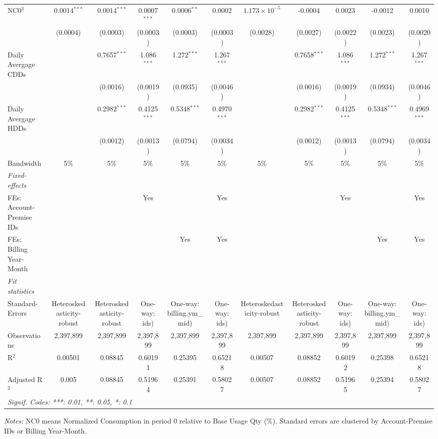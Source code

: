 \begin{table}[htbp]
\begin{tabular}{lcccccccccc}
NC0$^3$&0.0014$^{***}$ & 0.0014$^{***}$ & 0.0007$^{***}$ & 0.0006$^{**}$ & 0.0002 & $1.173\times 10^{-5}$ & -0.0004 & 0.0023 & -0.0012 & 0.0010\\
  &(0.0004) & (0.0003) & (0.0003) & (0.0003) & (0.0003) & (0.0028) & (0.0027) & (0.0022) & (0.0023) & (0.0020)\\
Daily Avergage CDDs&   & 0.7657$^{***}$ & 1.086$^{***}$ & 1.272$^{***}$ & 1.267$^{***}$ &    & 0.7658$^{***}$ & 1.086$^{***}$ & 1.272$^{***}$ & 1.267$^{***}$\\
  &   & (0.0016) & (0.0019) & (0.0935) & (0.0046) &    & (0.0016) & (0.0019) & (0.0934) & (0.0046)\\
Daily Avergage HDDs&   & 0.2982$^{***}$ & 0.4125$^{***}$ & 0.5348$^{***}$ & 0.4970$^{***}$ &    & 0.2982$^{***}$ & 0.4125$^{***}$ & 0.5348$^{***}$ & 0.4969$^{***}$\\
  &   & (0.0012) & (0.0013) & (0.0794) & (0.0034) &    & (0.0012) & (0.0013) & (0.0794) & (0.0034)\\
\midrule Bandwidth & 5\% & 5\% & 5\% & 5\% & 5\% & 5\% & 5\% & 5\% & 5\% & 5\%\\
\midrule
\emph{Fixed-effects}&   &   &   &   &   &   &   &   &   &  \\
FEs: Account-Premise IDs &  &  & Yes &  & Yes &  &  & Yes &  & Yes\\
FEs: Billing Year-Month &  &  &  & Yes & Yes &  &  &  & Yes & Yes\\
\midrule
\emph{Fit statistics}&  & & & & & & & & & \\
Standard-Errors& Heteroskedasticity-robust&Heteroskedasticity-robust&One-way: ids)&One-way: billing.ym\_mid)&One-way: ids)&Heteroskedasticity-robust&Heteroskedasticity-robust&One-way: ids)&One-way: billing.ym\_mid)&One-way: ids)\\
Observations & 2,397,899&2,397,899&2,397,899&2,397,899&2,397,899&2,397,899&2,397,899&2,397,899&2,397,899&2,397,899\\
R$^2$ & 0.00501&0.08845&0.60191&0.25395&0.65218&0.00507&0.08852&0.60192&0.25398&0.65218\\
Adjusted R$^2$ & 0.005&0.08845&0.51964&0.25391&0.58027&0.00507&0.08852&0.51965&0.25394&0.58027\\
\bottomrule\bottomrule
\multicolumn{11}{l}{\emph{Signif. Codes: ***: 0.01, **: 0.05, *: 0.1}}\\
\end{tabular}

\emph{\medskip Notes:} NC0 means Normalized Consumption in period 0 relative to Base Usage Qty (\%). Standard errors are clustered by Account-Premise IDs or Billing Year-Month.
\end{table}